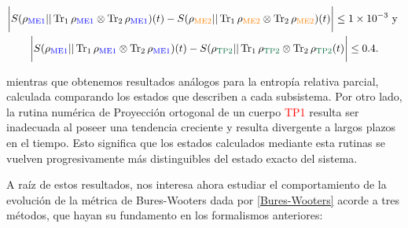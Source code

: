 \documentclass{report} %
\numberwithin{equation}{section}
\begin{document}
\begin{gather*}
    \bigg|S(\rho_{\textnormal{\textcolor{blue}{ME1}}}|| \Tr_{1}\rho_{\textnormal{\textcolor{blue}{ME1}}} \otimes \Tr_{2}\rho_{\textnormal{\textcolor{blue}{ME1}}})(t) - S(\rho_{\textnormal{\textcolor{orange}{ME2}}}|| \Tr_{1}\rho_{\textnormal{\textcolor{orange}{ME2}}} \otimes \Tr_{2}\rho_{\textnormal{\textcolor{orange}{ME2}}})(t) \bigg| \leq 1 \times10^{-3} \textnormal{ y } \\  
    \bigg|S(\rho_{\textnormal{\textcolor{blue}{ME1}}}|| \Tr_{1}\rho_{\textnormal{\textcolor{blue}{ME1}}} \otimes \Tr_{2}\rho_{\textnormal{\textcolor{blue}{ME1}}})(t) 
    - S(\rho_{\textnormal{\textcolor{dark green}{TP2}}}|| \Tr_{1}\rho_{\textnormal{\textcolor{dark green}{TP2}}} \otimes \Tr_{2}\rho_{\textnormal{\textcolor{dark green}{TP2}}} (t) \bigg| \leq 0.4.
\end{gather*}

mientras que obtenemos resultados análogos para la entropía relativa parcial, calculada comparando los estados que describen a cada subsistema. Por otro lado, la rutina numérica de Proyección ortogonal de un cuerpo \textcolor{red}{TP1} resulta ser inadecuada al poseer una tendencia creciente y resulta divergente a largos plazos en el tiempo. Esto significa que los estados calculados mediante esta rutinas se vuelven progresivamente más distinguibles del estado exacto del sistema. \newline 

A raíz de estos resultados, nos interesa ahora estudiar el comportamiento de la evolución de la métrica de Bures-Wooters dada por \eqref{Bures-Wooters} acorde a tres métodos, que hayan su fundamento en los formalismos anteriores:
\end{document}
